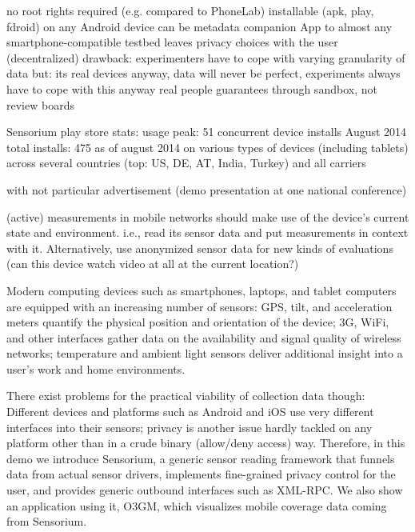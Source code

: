 no root rights required (e.g. compared to PhoneLab)
installable (apk, play, fdroid) on any Android device
can be metadata companion App to almost any smartphone-compatible testbed
leaves privacy choices with the user (decentralized)
drawback: experimenters have to cope with varying granularity of data
but: its real devices anyway, data will never be perfect, experiments always have to cope with this anyway
real people
guarantees through sandbox, not review boards

Sensorium play store stats:
usage peak: 51 concurrent device installs August 2014
total installs: 475 as of august 2014
on various types of devices (including tablets)
across several countries (top: US, DE, AT, India, Turkey)
and all carriers

with not particular advertisement (demo presentation at one national conference)

(active) measurements in mobile networks should make use of the device's current state and environment. i.e., read its sensor data and put measurements in context with it. Alternatively, use anonymized sensor data for new kinds of evaluations (can this device watch video at all at the current location?)


Modern computing devices such as smartphones, laptops, and tablet computers are equipped with an increasing number of sensors: \gls{GPS}, tilt, and acceleration meters quantify the physical position and orientation of the device; 3G, WiFi, and other  interfaces gather data on the availability and signal quality of wireless networks; temperature and ambient light sensors deliver additional insight into a user's work and home environments.

There exist problems for the practical viability of collection data though: Different devices and platforms such as Android and iOS use very different interfaces into their sensors; privacy is another issue hardly tackled on any platform other than in a crude binary (allow/deny access) way. Therefore, in this demo we introduce Sensorium, a generic sensor reading framework that funnels data from actual sensor drivers, implements fine-grained privacy control for the user, and provides generic outbound interfaces such as \acrshort{XML}-\acrshort{RPC}. We also show an application using it, \gls{O3GM}, which visualizes mobile coverage data coming from Sensorium.

